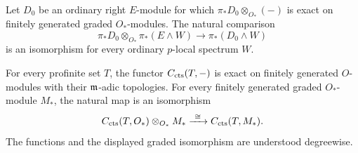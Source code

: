 \begin{lemma}\label{wup:base-change}
Let \(D_0\) be an ordinary right \(E\)-module for which
\(\pi_*D_0\otimes_{O_*}(-)\) is exact on finitely generated graded
\(O_*\)-modules. The natural comparison
\begin{equation}\label{wup:relative-base-change}
 \pi_*D_0\otimes_{O_*}\pi_*(E\wedge W)
 \longrightarrow \pi_*(D_0\wedge W)
\end{equation}
is an isomorphism for every ordinary \(p\)-local spectrum \(W\).

For every profinite set \(T\), the functor \(C_{\operatorname{cts}}(T,-)\) is exact
on finitely generated \(O\)-modules with their \(\mathfrak m\)-adic topologies.
For every finitely generated graded \(O_*\)-module \(M_*\), the
natural map is an isomorphism
\begin{equation}\label{wup:function-tensor}
 C_{\operatorname{cts}}(T,O_*)\otimes_{O_*}M_*
 \xrightarrow{\ \cong\ } C_{\operatorname{cts}}(T,M_*).
\end{equation}
The functions and the displayed graded isomorphism are understood
degreewise.
\end{lemma}

